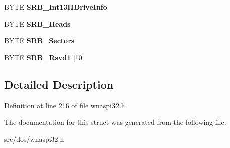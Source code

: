 \begin{DoxyCompactItemize}
\item 
\hypertarget{structSRB__GetDiskInfo_af5071404323564038aa531a4c8649c6b}{B\-Y\-T\-E {\bfseries S\-R\-B\-\_\-\-Int13\-H\-Drive\-Info}}\label{structSRB__GetDiskInfo_af5071404323564038aa531a4c8649c6b}

\item 
\hypertarget{structSRB__GetDiskInfo_a2be62e2845599c6f737fc04dba70ad2a}{B\-Y\-T\-E {\bfseries S\-R\-B\-\_\-\-Heads}}\label{structSRB__GetDiskInfo_a2be62e2845599c6f737fc04dba70ad2a}

\item 
\hypertarget{structSRB__GetDiskInfo_a6e9840eebcefd8acdc964d8c7a1c331d}{B\-Y\-T\-E {\bfseries S\-R\-B\-\_\-\-Sectors}}\label{structSRB__GetDiskInfo_a6e9840eebcefd8acdc964d8c7a1c331d}

\item 
\hypertarget{structSRB__GetDiskInfo_a20b6bfd35b4bb99e5e64ff174c9b9016}{B\-Y\-T\-E {\bfseries S\-R\-B\-\_\-\-Rsvd1} \mbox{[}10\mbox{]}}\label{structSRB__GetDiskInfo_a20b6bfd35b4bb99e5e64ff174c9b9016}

\end{DoxyCompactItemize}


\subsection{Detailed Description}


Definition at line 216 of file wnaspi32.\-h.



The documentation for this struct was generated from the following file\-:\begin{DoxyCompactItemize}
\item 
src/dos/wnaspi32.\-h\end{DoxyCompactItemize}
